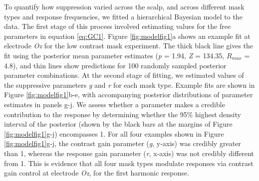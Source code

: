 \documentclass[]{article}
\begin{document}
To quantify how suppression varied across the scalp, and across different mask types and response frequencies, we fitted a hierarchical Bayesian model to the data. The first stage of this process involved estimating values for the free parameters in equation \eqref{eq:GC1}. Figure \ref{fig:modelfig1}a shows an example fit at electrode \emph{Oz} for the low contrast mask experiment. The thick black line gives the fit using the posterior mean parameter estimates (\emph{p} = 1.94, \emph{Z} = 134.35, \(R_{max}\) = 4.8), and thin lines show predictions for 100 randomly sampled posterior parameter combinations. At the second stage of fitting, we estimated values of the suppressive parameters \emph{g} and \emph{r} for each mask type. Example fits are shown in Figure \ref{fig:modelfig1}b-e, with accompanying posterior distributions of parameter estimates in panels g-j. We assess whether a parameter makes a credible contribution to the response by determining whether the 95\% highest density interval of the posterior (shown by the black bars at the margins of Figure \ref{fig:modelfig1}g-j) encompasses 1. For all four examples shown in Figure \ref{fig:modelfig1}g-j, the contrast gain parameter (\emph{g}, y-axis) was credibly greater than 1, whereas the response gain parameter (\emph{r}, x-axis) was not credibly different from 1. This is evidence that all four mask types modulate responses via contrast gain control at electrode \emph{Oz}, for the first harmonic response.
\end{document}
